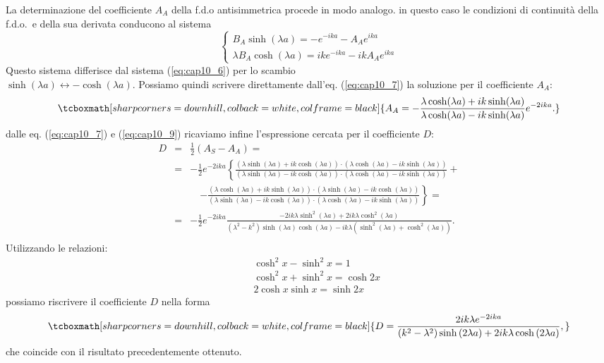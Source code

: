 La determinazione del coefficiente $A_A$ della f.d.o antisimmetrica procede in modo analogo. in questo caso le condizioni di continuità della f.d.o.~e della sua derivata conducono al sistema
	\begin{equation}
		\begin{cases}
		\displaystyle{B_A \sinh (\lambda a) = -e^{-ika}- A_A e^{ika}}\\
		\displaystyle{\lambda B_A \cosh (\lambda a) = ik e^{-ika}- ikA_A e^{ika}}
		\end{cases}
	\label{eq:cap10_8}
	\end{equation}
Questo sistema differisce dal sistema (\ref{eq:cap10_6}) per lo scambio\\ $\sinh (\lambda a) \leftrightarrow -\cosh (\lambda a)$. Possiamo quindi scrivere direttamente dall'eq. (\ref{eq:cap10_7}) la soluzione per il coefficiente $A_A$:
	\begin{equation}
		\tcboxmath[sharp corners=downhill, colback=white, colframe=black]{
			A_A=-\frac{\lambda \cosh (\lambda a)+ik \sinh (\lambda a)}{\lambda \cosh (\lambda a)-ik \sinh (\lambda a)}e^{-2ika}.
			}
	\label{eq:cap10_9}
	\end{equation}
dalle eq. (\ref{eq:cap10_7}) e (\ref{eq:cap10_9}) ricaviamo infine l'espressione cercata per il coefficiente $D$:
	\begin{eqnarray}
		D&=&\frac{1}{2}\left( A_S - A_A \right)= \nonumber \\
		&=& -\frac{1}{2}e^{-2ika}\left\lbrace \frac{\left( \lambda \sinh (\lambda a)+ ik \cosh (\lambda a )\right)\cdot\left( \lambda \cosh (\lambda a)- ik \sinh (\lambda a )\right)}{\left( \lambda\sinh ( \lambda a )-ik \cosh (\lambda a )\right)\cdot\left(\lambda \cosh ( \lambda a )-ik \sinh (\lambda a )\right)}\right. +\nonumber \\
		& &\quad \left. -\frac{\left( \lambda \cosh (\lambda a)+ ik \sinh (\lambda a )\right)\cdot \left( \lambda \sinh (\lambda a)- ik \cosh (\lambda a )\right)}{(\lambda \sinh (\lambda a)- ik\cosh (\lambda a )) \cdot (\lambda \cosh (\lambda a ) - ik \sinh (\lambda a ))}\right\rbrace= \nonumber \\
		&=& -\frac{1}{2}e^{-2ika} \frac{-2ik\lambda \sinh ^2 (\lambda a) + 2ik \lambda \cosh ^2 (\lambda a)}{ \left(\lambda ^2 - k^2 \right) \sinh (\lambda a ) \cosh (\lambda a) - ik\lambda \left(\sinh ^2 (\lambda a) + \cosh ^2 (\lambda a ) \right)}.\nonumber \\
	\end{eqnarray}
Utilizzando le relazioni:
	\begin{eqnarray}
		& &\cosh ^2 x - \sinh ^2 x=1 \nonumber \\
		& &\cosh ^2 x + \sinh ^2 x=\cosh 2x  \\
		& &2 \cosh  x \sinh  x=\sinh 2x \nonumber 
	\end{eqnarray}
possiamo riscrivere il coefficiente $D$ nella forma
	\begin{equation}
		\tcboxmath[sharp corners=downhill, colback=white, colframe=black]{	
			D=\frac{2ik\lambda e^{-2ika}}{\left(k^2-\lambda^2\right)\sinh \left(2\lambda a\right)+2ik\lambda \cosh\left(2\lambda a\right)},
			}
	\end{equation}
che coincide con il risultato precedentemente ottenuto.
